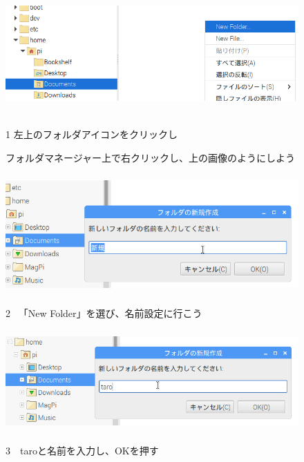 \documentclass[a4paper,12pt]{jarticle}
\begin{document}
\begin{figure}[ht]
  \vspace{8mm}\\
  \centering
  \includegraphics[width=13.33cm,height=4.74cm]{textbook-img034.png}
  \begin{minipage}{\textwidth}
    1
    左上のフォルダアイコンをクリックし

    フォルダマネージャー上で右クリックし、上の画像のようにしよう
  \end{minipage}

  \centering
  \includegraphics[width=12.483cm,height=4.584cm]{textbook-img036.png}
  \begin{minipage}{\textwidth}
    2
    \ 「New Folder」を選び、名前設定に行こう
  \end{minipage}

  \centering
  \includegraphics[width=12.776cm,height=3.879cm]{textbook-img039.png}
  \begin{minipage}{\textwidth}
    3　taroと名前を入力し、OKを押す
  \end{minipage}


\end{figure}
\end{document}
